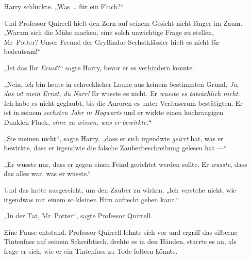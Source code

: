 Harry schluckte.
„Was … für ein Fluch?“

Und Professor Quirrell hielt den Zorn auf seinem Gesicht nicht länger im Zaum.
„Warum sich die Mühe machen, eine solch unwichtige Frage zu stellen, Mr~Potter? Unser Freund der Gryffindor-Sechstklässler hielt es nicht für bedeutsam!“

„Ist das Ihr \emph{Ernst}?“ sagte Harry, bevor er es verhindern konnte.

„Nein, ich bin heute in schrecklicher Laune aus keinem bestimmten Grund. \emph{Ja, das ist mein Ernst, du Narr!} Er wusste es nicht. Er \emph{wusste es tatsächlich nicht.} Ich habe es nicht geglaubt, bis die Auroren es unter Veritaserum bestätigten. Er ist in seinem \emph{sechsten Jahr in Hogwarts} und er wirkte einen hochrangigen Dunklen Fluch, \emph{ohne zu wissen, was er bewirkte.}“

„Sie meinen nicht“, sagte Harry, „dass er sich irgendwie \emph{geirrt} hat, was er bewirkte, dass er irgendwie die falsche Zauberbeschreibung gelesen hat —“

„Er wusste nur, dass er gegen einen Feind gerichtet werden sollte. Er \emph{wusste}, dass das alles war, was er wusste.“

Und das hatte ausgereicht, um den Zauber zu wirken.
„Ich verstehe nicht, wie irgendwas mit einem so kleinen Hirn aufrecht gehen kann.“

„In der Tat, Mr~Potter“, sagte Professor Quirrell.

Eine Pause entstand. Professor Quirrell lehnte sich vor und ergriff das silberne Tintenfass auf seinem Schreibtisch, drehte es in den Händen, starrte es an, als frage er sich, wie er ein Tintenfass zu Tode foltern könnte.

